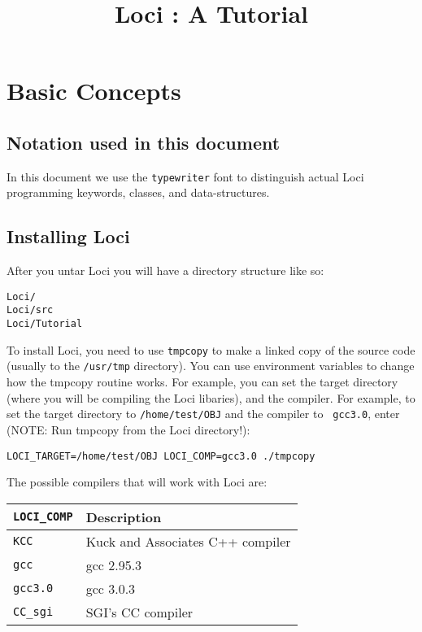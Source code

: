 \documentclass[10pt,epsf]{book}
\title { Loci : A Tutorial }
\begin{document}
\tableofcontents
\maketitle
\thispagestyle{empty}
\newpage
\setcounter{page}{1}
%
\chapter{ Basic Concepts }
\section{Notation used in this document}
In this document we use the {\tt typewriter} font to distinguish
actual Loci programming keywords, classes, and data-structures.
\section{ Installing Loci}
After you untar Loci you will have a directory structure like so:

\begin{verbatim}
Loci/
Loci/src
Loci/Tutorial
\end{verbatim}

To install Loci, you need to use {\tt tmpcopy} to make a linked copy
of the source code (usually to the {\tt /usr/tmp} directory).  You
can use environment variables to change how the tmpcopy routine works.
For example, you can set the target directory (where you will be
compiling the Loci libaries), and the compiler.  For example, to set
the target directory to {\tt /home/test/OBJ} and the compiler to {\tt
  gcc3.0}, enter (NOTE: Run tmpcopy from the Loci directory!):

\begin{verbatim}
LOCI_TARGET=/home/test/OBJ LOCI_COMP=gcc3.0 ./tmpcopy
\end{verbatim}

The possible compilers that will work with Loci are:  

\begin{center}
\begin{tabular}{|l|l|}
\hline
{\tt LOCI\_COMP} & Description \\
\hline
\hline
{\tt KCC }      & Kuck and Associates C++ compiler \\
{\tt gcc }      & gcc 2.95.3 \\
{\tt gcc3.0}    & gcc 3.0.3 \\
{\tt CC\_sgi}    & SGI's CC compiler \\
\hline
\end{tabular}
\end{center}
\end{document}
